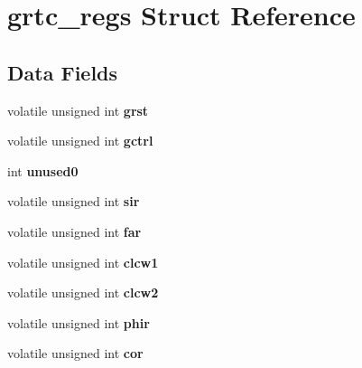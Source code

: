 \hypertarget{structgrtc__regs}{}\section{grtc\+\_\+regs Struct Reference}
\label{structgrtc__regs}
\subsection*{Data Fields}
\begin{DoxyCompactItemize}
\item 
\mbox{\label{structgrtc__regs_a2a26de70f99a47e7df92d5ddf69f302a}} 
volatile unsigned int {\bfseries grst}
\item 
\mbox{\label{structgrtc__regs_a3bdbf86be1ad67bc1fc3889004b078c3}} 
volatile unsigned int {\bfseries gctrl}
\item 
\mbox{\label{structgrtc__regs_a8e84b6e319d83b354fcbca8a4400dce3}} 
int {\bfseries unused0}
\item 
\mbox{\label{structgrtc__regs_a9711cc02b4bfea5c133d39edb7388712}} 
volatile unsigned int {\bfseries sir}
\item 
\mbox{\label{structgrtc__regs_a4185dc034754330dea785e2a93ba5db1}} 
volatile unsigned int {\bfseries far}
\item 
\mbox{\label{structgrtc__regs_a8dd4c5bb8c117d7681bfd180dd041025}} 
volatile unsigned int {\bfseries clcw1}
\item 
\mbox{\label{structgrtc__regs_a76f5a876b7645bfa8e93e381dc62b3d8}} 
volatile unsigned int {\bfseries clcw2}
\item 
\mbox{\label{structgrtc__regs_a41dd7a5a07488f589c1871b01dff570e}} 
volatile unsigned int {\bfseries phir}
\item 
\mbox{\label{structgrtc__regs_a2dde1c461ff8d5428e8dc48e9338d8a1}} 
volatile unsigned int {\bfseries cor}
\item 
\mbox{\label{structgrtc__regs_aab9d046c71d0b7aaec03a2ad39c0c66c}} 

\end{DoxyCompactItemize}

